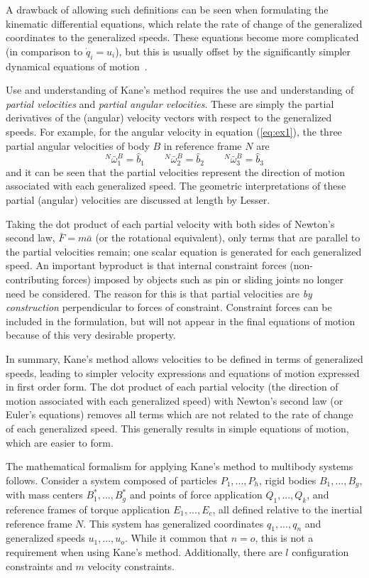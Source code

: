 \documentclass[smallcondensed,final]{svjour3}                     %
\begin{document}
A drawback of allowing such definitions can be seen when formulating the
kinematic differential equations, which relate the rate of change of the
generalized coordinates to the generalized speeds. These equations become more
complicated (in comparison to $\dot{q}_i = u_i$), but this is usually offset by
the significantly simpler dynamical equations of motion~\cite{Mitiguy1996}.

Use and understanding of Kane's method requires the use and understanding of
\textit{partial velocities} and \textit{partial angular velocities}. These are
simply the partial derivatives of the (angular) velocity vectors with respect
to the generalized speeds. For example, for the angular velocity in equation
(\ref{eq:ex1}), the three partial angular velocities of body $B$ in reference
frame $N$ are
\[
{^N}\bar{\omega}^B_{1} = \hat{b}_1 \quad \quad
{^N}\bar{\omega}^B_{2} = \hat{b}_2 \quad \quad
{^N}\bar{\omega}^B_{3} = \hat{b}_3
\]
and it can be seen that the partial velocities represent the direction of
motion associated with each generalized speed. The geometric interpretations of
these partial (angular) velocities are discussed at length by
Lesser\cite{Lesser1992}.

Taking the dot product of each partial velocity with both sides of Newton's
second law, $\bar{F}=m\bar{a}$ (or the rotational equivalent), only terms that
are parallel to the partial velocities remain; one scalar equation is generated
for each generalized speed. An important byproduct is that internal constraint forces
(non-contributing forces) imposed by objects such as pin or sliding joints no
longer need be considered. The reason for this is that partial velocities
are \textit{by construction} perpendicular to forces of constraint. Constraint
forces can be included in the formulation, but will not appear in the final
equations of motion because of this very desirable property.

In summary, Kane's method allows velocities to be defined in terms of
generalized speeds, leading to simpler velocity expressions and equations of
motion expressed in first order form.  The dot product of each partial velocity
(the direction of motion associated with each generalized speed) with Newton's
second law (or Euler's equations) removes all terms which are not related to
the rate of change of each generalized speed.  This generally results in simple
equations of motion, which are easier to form.

The mathematical formalism for applying Kane's method to multibody systems
follows. Consider a system composed of particles $P_1,...,P_h$, rigid bodies
$B_1,...,B_g$, with mass centers $B_1^*,...,B_g^*$ and points of force
application $Q_1,...,Q_k$, and reference frames of torque application
$E_1,...,E_c$, all defined relative to the inertial reference frame $N$. This
system has generalized coordinates $q_1,...,q_n$ and generalized speeds
$u_1,...,u_o$.  While it common that $n = o$, this is not a requirement when
using Kane's method. Additionally, there are $l$ configuration constraints and
$m$ velocity constraints.
\end{document}
